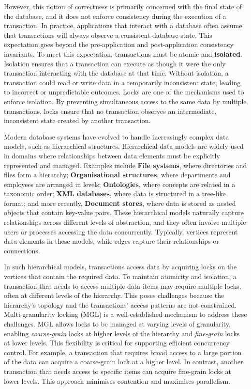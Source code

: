 However, this notion of correctness is primarily concerned with the final state of the database, and it does not enforce consistency during the execution of a transaction. In practice, applications that interact with a database often assume that transactions will always observe a consistent database state. This expectation goes beyond the pre-application and post-application consistency invariants. To meet this expectation, transactions must be atomic and \textbf{isolated}. Isolation ensures that a transaction can execute as though it were the only transaction interacting with the database at that time. Without isolation, a transaction could read or write data in a temporarily inconsistent state, leading to incorrect or unpredictable outcomes. Locks are one of the mechanisms used to enforce isolation. By preventing simultaneous access to the same data by multiple transactions, locks ensure that no transaction observes an intermediate, inconsistent state created by another transaction.

Modern database systems have evolved to handle increasingly complex data models, such as hierarchical structures. Hierarchical data models are widely used in domains where relationships between data elements must be explicitly represented and managed. Examples include \textbf{File systems}, where directories and files form a hierarchy; \textbf{Organisational structures}, where departments and employees are arranged in levels; \textbf{Ontologies}, where concepts are related in a taxonomic order; \textbf{XML databases}, where data is structured in a tree-like format; and more recently, \textbf{Document stores}, where data is stored as nested objects that contain key-value pairs. These hierarchical models naturally capture relationships across different levels of abstraction, and they often involve multiple users or processes accessing the data concurrently. Typically, vertices represent data elements in these models, while edges capture their relationships or connections.

In such hierarchical models, transactions access data by acquiring locks on the vertices that contain the required data. To maintain atomicity and isolation, a transaction that needs to access multiple data items may require multiple locks, often at different levels of the hierarchy. This poses challenges because the hierarchy's topology and the transactions' access patterns are not constrained. Multi-granularity locking (MGL) is a well-established mechanism to address these challenges. MGL allows locks to be managed at varying levels of granularity, enabling \emph{coarse-grain} locks at higher levels of the hierarchy and \emph{fine-grain} locks at lower levels. This flexibility is critical for supporting efficient concurrency control. For example, a transaction that requires broad access to a large portion of the data can acquire a coarse-grain lock at a higher level. In contrast, another transaction that needs access to specific items can acquire fine-grain locks at lower levels. This approach minimises contention and maximises parallelism.

